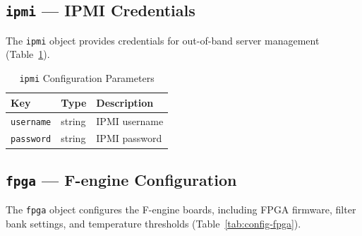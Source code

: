 \subsection{\texttt{ipmi} --- IPMI Credentials}

The \texttt{ipmi} object provides credentials for out-of-band server management (Table~\ref{tab:config-ipmi}).

\begin{table}[htbp]
    \centering
    \caption{\texttt{ipmi} Configuration Parameters}
    \label{tab:config-ipmi}
    \begin{tabular}{llp{7cm}}
        \toprule
        \textbf{Key} & \textbf{Type} & \textbf{Description} \\
        \midrule
        \texttt{username} & string & IPMI username \\
        \texttt{password} & string & IPMI password \\
        \bottomrule
    \end{tabular}
\end{table}

\subsection{\texttt{fpga} --- F-engine Configuration}

The \texttt{fpga} object configures the F-engine boards, including FPGA firmware, filter bank settings, and temperature thresholds (Table~\ref{tab:config-fpga}).

